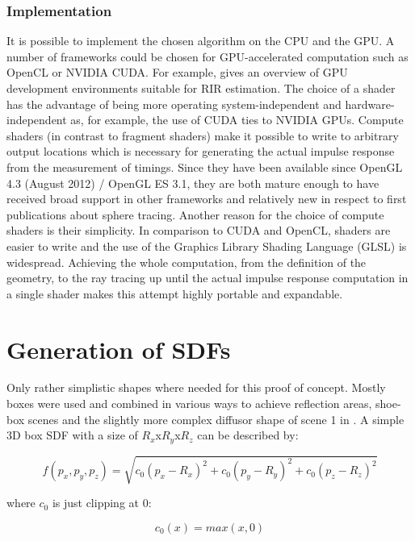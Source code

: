 \documentclass[twoside,a4paper]{article}
\begin{document}
\subsubsection{Implementation}
It is possible to implement the chosen algorithm on the CPU and the GPU. A number of frameworks could be chosen for GPU-accelerated computation such as OpenCL or NVIDIA CUDA. For example, \cite{stoltzfus_performance_2017} gives an overview of GPU development environments suitable for RIR estimation. The choice of a shader has the advantage of being more operating system-independent and hardware-independent as, for example, the use of CUDA ties to NVIDIA GPUs. Compute shaders (in contrast to fragment shaders) make it possible to write to arbitrary output locations which is necessary for generating the actual impulse response from the measurement of timings. Since they have been available since OpenGL 4.3 (August 2012) / OpenGL ES 3.1, they are both mature enough to have received broad support in other frameworks and relatively new in respect to first publications about sphere tracing. Another reason for the choice of compute shaders is their simplicity. In comparison to CUDA and OpenCL, shaders are easier to write and the use of the Graphics Library Shading Language (GLSL) is widespread. Achieving the whole computation, from the definition of the geometry, to the ray tracing up until the actual impulse response computation in a single shader makes this attempt highly portable and expandable.

\section{Generation of SDFs}

Only rather simplistic shapes where needed for this proof of concept. Mostly boxes were used and combined in various ways to achieve reflection areas, shoe-box scenes and the slightly more complex diffusor shape of scene 1 in \cite{brinkmann_round_2019}. A simple 3D box SDF with a size of $R_x$x$R_y$x$R_z$ can be described by:

\begin{equation}
  f(p_x, p_y, p_z) = \sqrt{c_0(p_x - R_x)^2 + c_0(p_y - R_y)^2 + c_0(p_z - R_z)^2}
  \label{eq:eq1}
\end{equation}

where $c_0$ is just clipping at 0:

\begin{equation}
c_0(x) = max(x,0) 
\end{equation}
\end{document}
